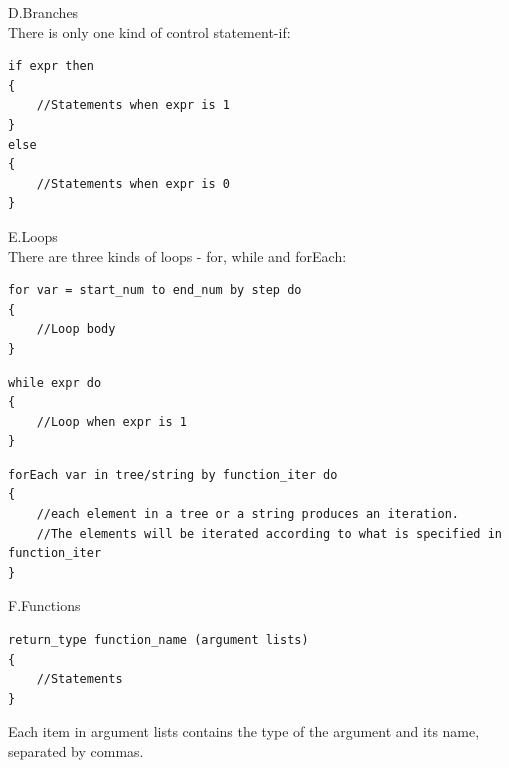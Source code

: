 \documentclass[aps,letterpaper,10pt]{revtex4}
\begin{document}
\begin{description}
\begin{itemize}
\begin{table}[h]
\begin{tabular}{|l|l|}
\hline
\end{tabular}

\end{table}

\end{itemize}

\item D.Branches\\
There is only one kind of control statement-if:
\begin{lstlisting}
if expr then
{
	//Statements when expr is 1
}
else
{
	//Statements when expr is 0
}

\end{lstlisting}
\item E.Loops\\
There are three kinds of loops - for, while and forEach:
\begin{lstlisting}
for var = start_num to end_num by step do
{
	//Loop body
}
\end{lstlisting}
\begin{lstlisting}
while expr do
{
	//Loop when expr is 1
}
\end{lstlisting}
\begin{lstlisting}
forEach var in tree/string by function_iter do
{
	//each element in a tree or a string produces an iteration.
	//The elements will be iterated according to what is specified in function_iter
}

\end{lstlisting}
\item F.Functions\\

\begin{lstlisting}
return_type function_name (argument lists)
{
	//Statements
}
\end{lstlisting}
Each item in argument lists contains the type of the argument and its name, separated by commas.
\end{description}
\end{document}
